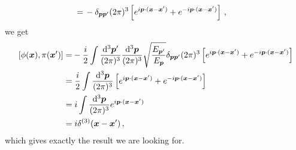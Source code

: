 \begin{sol}
\begin{equation}
\begin{split}
        = & \, - \delta_{\boldsymbol{p} \boldsymbol{p}'} (2\pi)^3 \left[e^{i\boldsymbol{p} \cdot (\boldsymbol{x} - \boldsymbol{x}')} + e^{-i\boldsymbol{p} \cdot (\boldsymbol{x} - \boldsymbol{x}')}\right] \, ,
    \end{split}
    \end{equation}
    we get 
    \begin{equation}
    \begin{split}
        [\phi(\boldsymbol{x}), \pi(\boldsymbol{x}')] = & - \frac{i}{2} \int \frac{{\rm d}^3\boldsymbol{p}'}{(2\pi)^3} \frac{{\rm d}^3\boldsymbol{p}}{(2\pi)^3} \sqrt{\frac{E_{\boldsymbol{p}'}}{E_{\boldsymbol{p}}}} \delta_{\boldsymbol{p} \boldsymbol{p}'} (2\pi)^3 \left[e^{i\boldsymbol{p} \cdot (\boldsymbol{x} - \boldsymbol{x}')} + e^{-i\boldsymbol{p} \cdot (\boldsymbol{x} - \boldsymbol{x}')}\right] \\
        = &\; \frac{i}{2} \int \frac{{\rm d}^3\boldsymbol{p}}{(2\pi)^3} \left[e^{i\boldsymbol{p} \cdot (\boldsymbol{x} - \boldsymbol{x}')} + e^{-i\boldsymbol{p} \cdot (\boldsymbol{x} - \boldsymbol{x}')}\right] \\
        = &\; i \int \frac{{\rm d}^3\boldsymbol{p}}{(2\pi)^3} e^{i\boldsymbol{p} \cdot (\boldsymbol{x} - \boldsymbol{x}')} \\
        = &\; i \delta^{(3)}(\boldsymbol{x} - \boldsymbol{x}') \, ,
    \end{split}
    \end{equation}
    which gives exactly the result we are looking for.
\end{sol}

